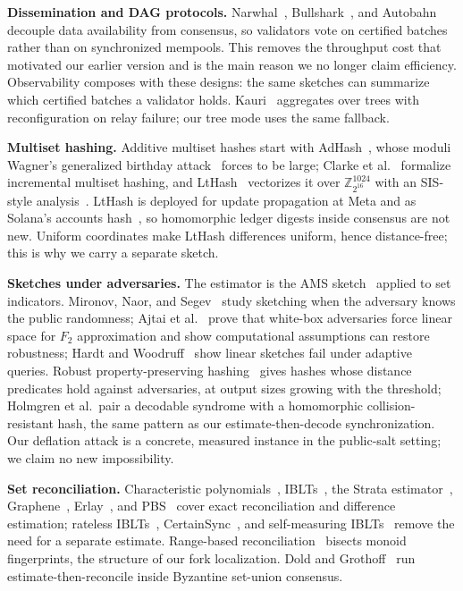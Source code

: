 \documentclass[journal]{IEEEtran}
\begin{document}
\textbf{Dissemination and DAG protocols.} Narwhal~\cite{narwhal},
Bullshark~\cite{bullshark}, and Autobahn~\cite{giridharan2024autobahn}
decouple data availability from consensus, so validators vote on
certified batches rather than on synchronized mempools. This removes the
throughput cost that motivated our earlier version and is the main reason
we no longer claim efficiency. Observability composes with these designs:
the same sketches can summarize which certified batches a validator
holds. Kauri~\cite{kauri} aggregates over trees with reconfiguration
on relay failure; our tree mode uses the same fallback.

\textbf{Multiset hashing.} Additive multiset hashes start with
AdHash~\cite{bellare1997adhash}, whose moduli Wagner's generalized
birthday attack~\cite{wagner2002gbp} forces to be large; Clarke et
al.~\cite{clarke2003multiset} formalize incremental multiset hashing, and
LtHash~\cite{lewi2019lthash} vectorizes it over $\mathbb{Z}_{2^{16}}^{1024}$
with an SIS-style analysis~\cite{ajtai1996sis}. LtHash is deployed for
update propagation at Meta and as Solana's accounts hash~\cite{simd0215},
so homomorphic ledger digests inside consensus are not new. Uniform
coordinates make LtHash differences uniform, hence distance-free; this is
why we carry a separate sketch.

\textbf{Sketches under adversaries.} The estimator is the AMS
sketch~\cite{ams1996} applied to set indicators. Mironov, Naor, and
Segev~\cite{mironov2011sketching} study sketching when the adversary
knows the public randomness; Ajtai et al.~\cite{ajtai2022whitebox} prove
that white-box adversaries force linear space for $F_{2}$ approximation
and show computational assumptions can restore robustness; Hardt and
Woodruff~\cite{hardt2013robust} show linear sketches fail under adaptive
queries. Robust property-preserving
hashing~\cite{boyle2019pph,fleischhacker2021pph,holmgren2022pph} gives
hashes whose distance predicates hold against adversaries, at output
sizes growing with the threshold; Holmgren et al.\ pair a decodable
syndrome with a homomorphic collision-resistant hash, the same pattern
as our estimate-then-decode synchronization. Our deflation attack is a
concrete, measured instance in the public-salt setting; we claim no new
impossibility.

\textbf{Set reconciliation.} Characteristic
polynomials~\cite{minsky2003}, IBLTs~\cite{goodrich2011iblt}, the Strata
estimator~\cite{eppstein2011strata}, Graphene~\cite{ozisik2019graphene},
Erlay~\cite{naumenko2019erlay}, and PBS~\cite{gong2020pbs} cover exact
reconciliation and difference estimation; rateless
IBLTs~\cite{yang2024rateless}, CertainSync~\cite{keniagin2025certainsync},
and self-measuring IBLTs~\cite{wu2026ibltmeasure} remove the need for a
separate estimate. Range-based reconciliation~\cite{meyer2023rbsr} bisects
monoid fingerprints, the structure of our fork localization. Dold and
Grothoff~\cite{dold2017setunion} run estimate-then-reconcile inside
Byzantine set-union consensus.
\end{document}
